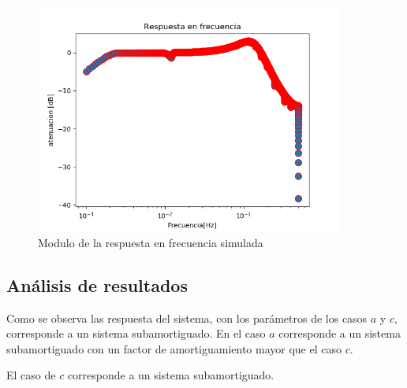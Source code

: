\documentclass[../../guia1.tex]{subfiles}
\begin{document}
\begin{figure}[H]
  \centering
   \includegraphics[width=0.9\textwidth]{figures/rtaFrec.png}
  \caption{Modulo de la respuesta en frecuencia simulada}
  \label{fig:rtaFrecFin}
\end{figure}
\subsection*{Análisis de resultados}
Como se observa las respuesta del sistema, con los parámetros de los casos $a$ y $c$, corresponde a un sistema subamortiguado. En el caso $a$ corresponde a un sistema subamortiguado con un factor de amortiguamiento mayor que el caso $c$.
\par El caso de $c$ corresponde a un sistema subamortiguado.
\end{document}
